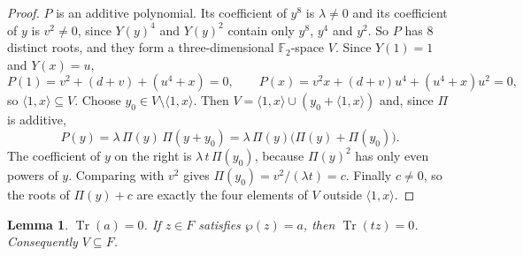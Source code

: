 \documentclass[11pt]{amsart}
\newtheorem{lemma}[theorem]{Lemma}
\theoremstyle{definition}
\theoremstyle{remark}
\numberwithin{equation}{section}
\newcommand{\F}{\mathbb{F}}
\newcommand{\Tr}{\operatorname{Tr}}
\begin{document}
\begin{proof}
$P$ is an additive polynomial. Its coefficient of $y^8$ is $\lambda\ne0$ and its coefficient of $y$ is $v^2\ne0$, since $Y(y)^4$ and $Y(y)^2$ contain only $y^8$, $y^4$ and $y^2$. So $P$ has $8$ distinct roots, and they form a three-dimensional $\F_2$-space $V$. Since $Y(1)=1$ and $Y(x)=u$,
\[
P(1)=v^2+(d+v)+(u^4+x)=0,\qquad P(x)=v^2x+(d+v)u^4+(u^4+x)u^2=0 ,
\]
so $\langle1,x\rangle\subseteq V$. Choose $y_0\in V\setminus\langle1,x\rangle$. Then $V=\langle1,x\rangle\cup(y_0+\langle1,x\rangle)$ and, since $\Pi$ is additive,
\[
P(y)=\lambda\,\Pi(y)\,\Pi(y+y_0)=\lambda\,\Pi(y)\bigl(\Pi(y)+\Pi(y_0)\bigr).
\]
The coefficient of $y$ on the right is $\lambda\,t\,\Pi(y_0)$, because $\Pi(y)^2$ has only even powers of $y$. Comparing with $v^2$ gives $\Pi(y_0)=v^2/(\lambda t)=c$. Finally $c\ne0$, so the roots of $\Pi(y)+c$ are exactly the four elements of $V$ outside $\langle1,x\rangle$.
\end{proof}

\begin{lemma}\label{lem:inF}
$\Tr(a)=0$. If $z\in F$ satisfies $\wp(z)=a$, then $\Tr(tz)=0$. Consequently $V\subseteq F$.
\end{lemma}
\end{document}
